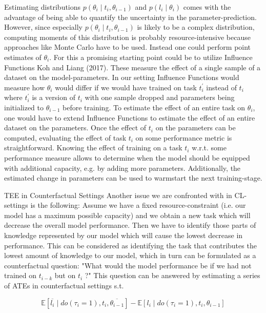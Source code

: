 \documentclass[10pt]{article}
\begin{document}
Estimating distributions $p\left(\theta_{i} \mid t_{i}, \theta_{i-1}\right)$ and $p\left(l_{i} \mid \theta_{i}\right)$ comes with the advantage of being able to quantify the uncertainty in the parameter-prediction. However, since especially $p\left(\theta_{i} \mid t_{i}, \theta_{i-1}\right)$ is likely to be a complex distribution, computing moments of this distribution is probably resource-intensive because approaches like Monte Carlo have to be used. Instead one could perform point estimates of $\theta_{i}$. For this a promising starting point could be to utilize Influence Functions Koh and Liang (2017). These measure the effect of a single sample of a dataset on the model-parameters. In our setting Influence Functions would measure how $\theta_{i}$ would differ if we would have trained on task $t_{i}^{\prime}$ instead of $t_{i}$ where $t_{i}^{\prime}$ is a version of $t_{i}$ with one sample dropped and parameters being initialized to $\theta_{i-1}$ before training. To estimate the effect of an entire task on $\theta_{i}$, one would have to extend Influence Functions to estimate the effect of an entire dataset on the parameters. Once the effect of $t_{i}$ on the parameters can be computed, evaluating the effect of task $t_{i}$ on some performance metric is straightforward. Knowing the effect of training on a task $t_{i}$ w.r.t. some performance measure allows to determine when the model should be equipped with additional capacity, e.g. by adding more parameters. Additionally, the estimated change in parameters can be used to warmstart the next training-stage.

TEE in Counterfactual Settings Another issue we are confronted with in CL-settings is the following: Assume we have a fixed resource-constraint (i.e. our model has a maximum possible capacity) and we obtain a new task which will decrease the overall model performance. Then we have to identify those parts of knowledge represented by our model which will cause the lowest decrease in performance. This can be considered as identifying the task that contributes the lowest amount of knowledge to our model, which in turn can be formulated as a counterfactual question: "What would the model performance be if we had not trained on $t_{i-k}$ but on $t_{i}$ ?" This question can be answered by estimating a series of ATEs in counterfactual settings s.t.


\begin{equation*}
\mathbb{E}\left[\overline{l_{i}} \mid d o\left(\tau_{i}=1\right), t_{i}, \overline{\theta_{i-1}}\right]-\mathbb{E}\left[l_{i} \mid d o\left(\tau_{i}=1\right), t_{i}, \theta_{i-1}\right] \tag{3}
\end{equation*}
\end{document}
